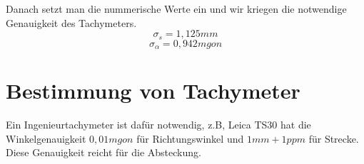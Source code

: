 \documentclass[12pt]{article}
\begin{document}
Danach setzt man die nummerische Werte ein und wir kriegen die notwendige Genauigkeit des Tachymeters.
\begin{equation*}
\sigma_s = 1,125 mm
\end{equation*}
\begin{equation*}
\sigma_{\alpha} = 0,942 mgon
\end{equation*}
\section{Bestimmung von Tachymeter}
Ein Ingenieurtachymeter ist dafür notwendig, z.B, Leica TS30 hat die Winkelgenauigkeit $0,01 mgon$ für Richtungswinkel und $1mm + 1ppm$ für Strecke. Diese Genauigkeit reicht für die Absteckung. 
\end{document}
